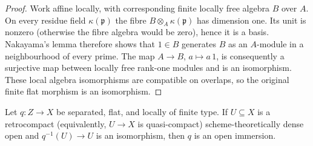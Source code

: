 \begin{proof}
  Work affine locally, with corresponding finite locally free algebra $B$ over
  $A$.  On every residue field $\kappa(\mathfrak p)$ the fibre
  $B\otimes_A\kappa(\mathfrak p)$ has dimension one.  Its unit is nonzero
  (otherwise the fibre algebra would be zero), hence it is a basis.  Nakayama's
  lemma therefore shows that $1\in B$ generates $B$ as an $A$-module in a
  neighbourhood of every prime.  The map $A\to B$, $a\mapsto a\,1$, is
  consequently a surjective map between locally free rank-one modules and is
  an isomorphism.  These local algebra isomorphisms are compatible on
  overlaps, so the original finite flat morphism is an isomorphism.
\end{proof}

\begin{lemma}
  \label{lemma:nagata-flat-strict-transform-open}

  Let $q\colon Z\to X$ be separated, flat, and locally of finite type.  If
  $U\subseteq X$ is a retrocompact (equivalently, $U\to X$ is
  quasi-compact) scheme-theoretically dense open and
  $q^{-1}(U)\to U$ is an isomorphism, then $q$ is an open immersion.
\end{lemma}

